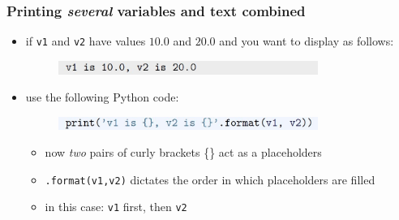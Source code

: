 \documentclass[14pt]{beamer}
\begin{document}
\begin{frame}[fragile]
\frametitle{Printing \emph{several} variables and text combined}

\begin{itemize}
\item if \texttt{v1} and \texttt{v2} have values $10.0$ and $20.0$ and you want to display as follows:

\begin{figure}[ht]
	\centering
	\includegraphics[width=0.8\textwidth]{figures/LLp28d}
\end{figure}

\item use the following Python code:
\begin{figure}[ht]
	\centering
	\includegraphics[width=0.8\textwidth]{figures/LLp28c}
\end{figure}
\vspace*{-3mm}
	\begin{itemize}
		\item now \emph{two} pairs of curly brackets \{\} act as a placeholders
		\item \texttt{.format(v1,v2)} dictates the order in which placeholders are filled
		\item in this case: \texttt{v1} first, then \texttt{v2}
	\end{itemize}
\end{itemize}

\end{frame}

\end{document}
